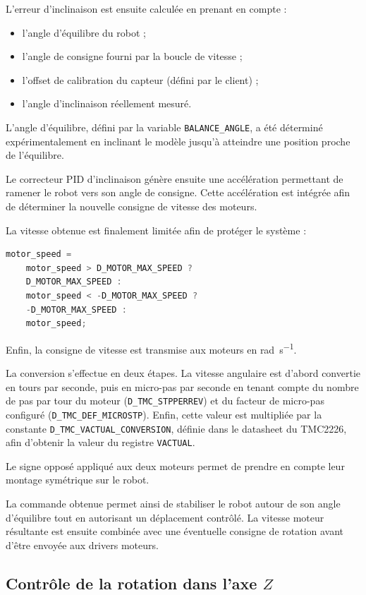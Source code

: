 L'erreur d'inclinaison est ensuite calculée en prenant en compte :
\begin{itemize}
    \item l'angle d'équilibre du robot ;
    \item l'angle de consigne fourni par la boucle de vitesse ;
    \item l'offset de calibration du capteur (défini par le client) ;
    \item l'angle d'inclinaison réellement mesuré.
\end{itemize}

L'angle d'équilibre, défini par la variable \texttt{BALANCE\_ANGLE}, a été déterminé expérimentalement en inclinant le modèle jusqu'à atteindre une position proche de l'équilibre.

Le correcteur PID d'inclinaison génère ensuite une accélération permettant de ramener le robot vers son angle de consigne. Cette accélération est intégrée afin de déterminer la nouvelle consigne de vitesse des moteurs.

La vitesse obtenue est finalement limitée afin de protéger le système :
\begin{lstlisting}[language=C++]
motor_speed =
    motor_speed > D_MOTOR_MAX_SPEED ?
    D_MOTOR_MAX_SPEED :
    motor_speed < -D_MOTOR_MAX_SPEED ?
    -D_MOTOR_MAX_SPEED :
    motor_speed;
\end{lstlisting}

Enfin, la consigne de vitesse est transmise aux moteurs en \si{rad.s^{-1}}.

La conversion s'effectue en deux étapes. La vitesse angulaire est d'abord convertie en tours par seconde, puis en micro-pas par seconde en tenant compte du nombre de pas par tour du moteur (\texttt{D\_TMC\_STPPERREV}) et du facteur de micro-pas configuré (\texttt{D\_TMC\_DEF\_MICROSTP}). Enfin, cette valeur est multipliée par la constante \texttt{D\_TMC\_VACTUAL\_CONVERSION}, définie dans le datasheet du TMC2226, afin d'obtenir la valeur du registre \texttt{VACTUAL}.

Le signe opposé appliqué aux deux moteurs permet de prendre en compte leur montage symétrique sur le robot.

La commande obtenue permet ainsi de stabiliser le robot autour de son angle d'équilibre tout en autorisant un déplacement contrôlé. La vitesse moteur résultante est ensuite combinée avec une éventuelle consigne de rotation avant d'être envoyée aux drivers moteurs.
\subsection{Contrôle de la rotation dans l'axe $Z$}

